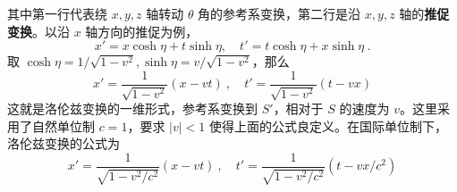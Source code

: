 其中第一行代表绕 $x,y,z$ 轴转动 $\theta$ 角的参考系变换，第二行是沿 $x,y,z$ 轴的\textbf{推促变换}。以沿 $x$ 轴方向的推促为例，
\begin{equation}
x'=x\cosh\eta + t\sinh\eta,\quad t'=t\cosh\eta+x\sinh\eta~.
\end{equation}
取 $\cosh\eta = 1/\sqrt{1-v^2},\sinh\eta = v/\sqrt{1-v^2}$，那么
\begin{equation}
x'=\frac{1}{\sqrt{1-v^2}}(x-v t)~,\quad t'=\frac{1}{\sqrt{1-v^2}}(t-vx)
\end{equation}
这就是洛伦兹变换的一维形式，参考系变换到 $S'$，相对于 $S$ 的速度为 $v$。这里采用了自然单位制 $c=1$，要求 $|v|< 1$ 使得上面的公式良定义。在国际单位制下，洛伦兹变换的公式为
\begin{equation}
x'=\frac{1}{\sqrt{1-v^2/c^2}}(x-v t)~,\quad t'=\frac{1}{\sqrt{1-v^2/c^2}}(t-vx/c^2)
\end{equation}